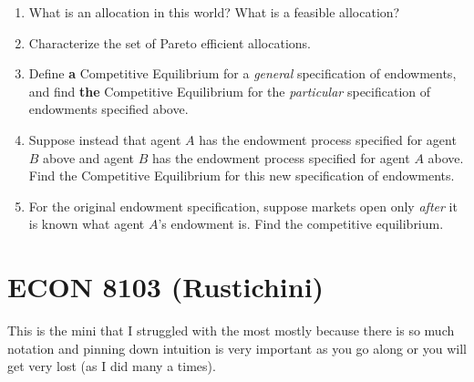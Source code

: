 \documentclass[11pt,english]{article}
\begin{document}
\begin{enumerate}
    \item[(1)] What is an allocation in this world? What is a feasible
        allocation?
    \begin{solution}
 
    \end{solution}
 
    \item[(2)] Characterize the set of Pareto efficient allocations.
    \begin{solution}
 
    \end{solution}
 
    \item[(3)] Define \textbf{a} Competitive Equilibrium for a \textit{general}
        specification of endowments, and find \textbf{the} Competitive
        Equilibrium for the \textit{particular} specification of endowments
        specified above.
    \begin{solution}
 
    \end{solution}
 
    \item[(4)] Suppose instead that agent $A$ has the endowment process
        specified for agent $B$ above and agent $B$ has the endowment process
        specified for agent $A$ above. Find the Competitive Equilibrium for
        this new specification of endowments.
    \begin{solution}
 
    \end{solution}
 
    \item[(5)] For the original endowment specification, suppose markets open
        only \textit{after} it is known what agent $A$'s endowment is. Find
        the competitive equilibrium.
    \begin{solution}
 
    \end{solution}
\end{enumerate}

\section{ECON 8103 (Rustichini)}
This is the mini that I struggled with the most mostly because there is so much notation and pinning down intuition is very important as you go along or you will get very lost (as I did many a times).
\end{document}

